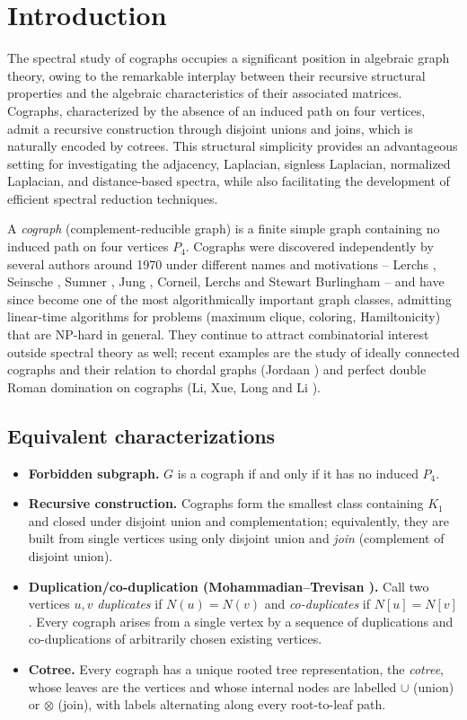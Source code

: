 \documentclass[11pt]{article}
\theoremstyle{plain}
\theoremstyle{definition}
\theoremstyle{remark}
\begin{document}
	\section{Introduction}
	\label{sec:intro}
	The spectral study of cographs occupies a significant position in algebraic graph theory, owing to the remarkable interplay between their recursive structural properties and the algebraic characteristics of their associated matrices. Cographs, characterized by the absence of an induced path on four vertices, admit a recursive construction through disjoint unions and joins, which is naturally encoded by cotrees. This structural simplicity provides an advantageous setting for investigating the adjacency, Laplacian, signless Laplacian, normalized Laplacian, and distance-based spectra, while also facilitating the development of efficient spectral reduction techniques.
	
	\medskip
	A \emph{cograph} (complement-reducible graph) is a finite simple graph containing no induced path on four vertices $P_4$. Cographs were discovered independently by several authors around 1970 under different names and motivations -- Lerchs \cite{Lerchs1971}, Seinsche \cite{Seinsche1974}, Sumner \cite{Sumner1974}, Jung \cite{Jung1978}, Corneil, Lerchs and Stewart Burlingham \cite{CorneilLerchsStewart1981} -- and have since become one of the most algorithmically important graph classes, admitting linear-time algorithms for problems (maximum clique, coloring, Hamiltonicity) that are NP-hard in general. They continue to attract combinatorial interest outside spectral theory as well; recent examples are the study of ideally connected cographs and their relation to chordal graphs (Jordaan \cite{Jordaan2026}) and perfect double Roman domination on cographs (Li, Xue, Long and Li \cite{LiXueLongLi2025}).
	
	\subsection{Equivalent characterizations}
	
	\begin{itemize}
		\item \textbf{Forbidden subgraph.} $G$ is a cograph if and only if it has no induced $P_4$.
		\item \textbf{Recursive construction.} Cographs form the smallest class containing $K_1$ and closed under disjoint union and complementation; equivalently, they are built from single vertices using only disjoint union and \emph{join} (complement of disjoint union).
		\item \textbf{Duplication/co-duplication (Mohammadian--Trevisan \cite{MohammadianTrevisan2016}).} Call two vertices $u,v$ \emph{duplicates} if $N(u)=N(v)$ and \emph{co-duplicates} if $N[u]=N[v]$. Every cograph arises from a single vertex by a sequence of duplications and co-duplications of arbitrarily chosen existing vertices.
		\item \textbf{Cotree.} Every cograph has a unique rooted tree representation, the \emph{cotree}, whose leaves are the vertices and whose internal nodes are labelled $\cup$ (union) or $\otimes$ (join), with labels alternating along every root-to-leaf path.
	\end{itemize}
	
\end{document}
